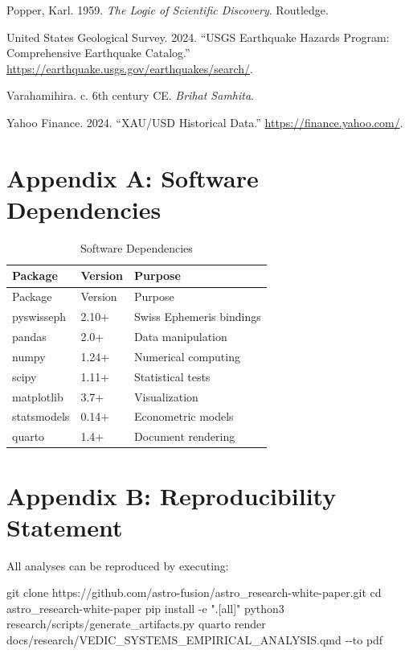 \documentclass[
  11pt,
  a4paper,
  oneside,
  openany]{article}
\newenvironment{Shaded}{\begin{snugshade}}{\end{snugshade}}
\newcommand{\AttributeTok}[1]{\textcolor[rgb]{0.40,0.45,0.13}{#1}}
\newcommand{\BuiltInTok}[1]{\textcolor[rgb]{0.00,0.23,0.31}{#1}}
\newcommand{\ExtensionTok}[1]{\textcolor[rgb]{0.00,0.23,0.31}{#1}}
\newcommand{\FunctionTok}[1]{\textcolor[rgb]{0.28,0.35,0.67}{#1}}
\newcommand{\NormalTok}[1]{\textcolor[rgb]{0.00,0.23,0.31}{#1}}
\newcommand{\StringTok}[1]{\textcolor[rgb]{0.13,0.47,0.30}{#1}}
\newlength{\cslhangindent}
\newenvironment{CSLReferences}[2] %
 {\begin{list}{}{%
  \setlength{\itemindent}{0pt}
  \setlength{\leftmargin}{0pt}
  \setlength{\parsep}{0pt}
  \ifodd #1
   \setlength{\leftmargin}{\cslhangindent}
   \setlength{\itemindent}{-1\cslhangindent}
  \fi
  \setlength{\itemsep}{#2\baselineskip}}}
 {\end{list}}
\begin{document}
\begin{CSLReferences}{1}{0}
Popper, Karl. 1959. \emph{The Logic of Scientific Discovery}. Routledge.

United States Geological Survey. 2024. {``USGS Earthquake Hazards
Program: Comprehensive Earthquake Catalog.''}
\url{https://earthquake.usgs.gov/earthquakes/search/}.

Varahamihira. c. 6th century CE. \emph{Brihat Samhita}.

Yahoo Finance. 2024. {``XAU/USD Historical Data.''}
\url{https://finance.yahoo.com/}.

\end{CSLReferences}

\section{Appendix A: Software
Dependencies}\label{appendix-a-software-dependencies}

\begin{longtable}[]{@{}lll@{}}
\caption{Software Dependencies}\label{tbl-software}\tabularnewline
\toprule\noalign{}
Package & Version & Purpose \\
\midrule\noalign{}
\endfirsthead
\toprule\noalign{}
Package & Version & Purpose \\
\midrule\noalign{}
\endhead
\bottomrule\noalign{}
\endlastfoot
pyswisseph & 2.10+ & Swiss Ephemeris bindings \\
pandas & 2.0+ & Data manipulation \\
numpy & 1.24+ & Numerical computing \\
scipy & 1.11+ & Statistical tests \\
matplotlib & 3.7+ & Visualization \\
statsmodels & 0.14+ & Econometric models \\
quarto & 1.4+ & Document rendering \\
\end{longtable}

\section{Appendix B: Reproducibility
Statement}\label{appendix-b-reproducibility-statement}

All analyses can be reproduced by executing:

\begin{Shaded}
\begin{Highlighting}[]
\FunctionTok{git}\NormalTok{ clone https://github.com/astro{-}fusion/astro\_research{-}white{-}paper.git}
\BuiltInTok{cd}\NormalTok{ astro\_research{-}white{-}paper}
\ExtensionTok{pip}\NormalTok{ install }\AttributeTok{{-}e} \StringTok{".[all]"}
\ExtensionTok{python3}\NormalTok{ research/scripts/generate\_artifacts.py}
\ExtensionTok{quarto}\NormalTok{ render docs/research/VEDIC\_SYSTEMS\_EMPIRICAL\_ANALYSIS.qmd }\AttributeTok{{-}{-}to}\NormalTok{ pdf}
\end{Highlighting}
\end{Shaded}
\end{document}
